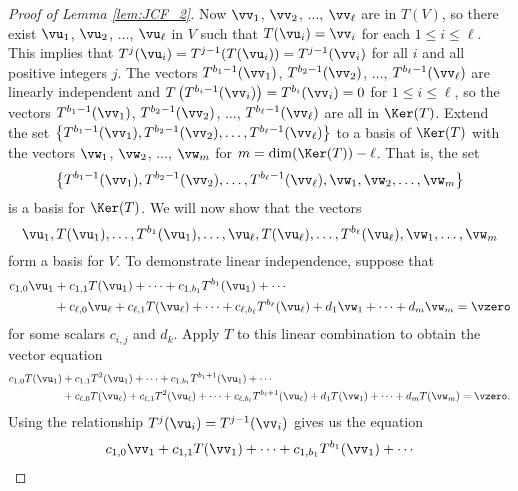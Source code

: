 \begin{proof}[Proof of Lemma \ref{lem:JCF_2}]
Now $\vv_1$, $\vv_2$, $\ldots$, $\vv_{\ell}$ are in $T(V)$, so there exist $\vu_1$, $\vu_2$, $\ldots$, $\vu_{\ell}$ in $V$ such that $T(\vu_i) = \vv_i$ for each $1 \leq i \leq \ell$. This implies that $T^j(\vu_i) = T^{j-1}(T(\vu_i)) = T^{j-1}(\vv_i)$ for all $i$ and all positive integers $j$. The vectors $T^{b_1-1}(\vv_1)$, $T^{b_2-1}(\vv_2)$, $\ldots$, $T^{b_{\ell}-1}(\vv_{\ell})$ are linearly independent and $T\left(T^{b_i-1}(\vv_i)\right) = T^{b_i}(\vv_i) = 0$ for $1 \leq i \leq \ell$, so the vectors $T^{b_1-1}(\vv_1)$, $T^{b_2-1}(\vv_2)$, $\ldots$, $T^{b_{\ell}-1}(\vv_{\ell})$ are all in $\Ker(T)$. Extend the set $\left\{T^{b_1-1}(\vv_1), T^{b_2-1}(\vv_2), \ldots, T^{b_{\ell}-1}(\vv_{\ell})\right\}$ to a basis of $\Ker(T)$ with the vectors $\vw_1$, $\vw_2$, $\ldots$, $\vw_m$ for $m = \dim(\Ker(T)) - \ell$. That is, the set 
\begin{equation} \label{eq:JCF_Ker_basis}
\left\{T^{b_1-1}(\vv_1), T^{b_2-1}(\vv_2), \ldots, T^{b_{\ell}-1}(\vv_{\ell}), \vw_1, \vw_2, \ldots, \vw_m\right\}
\end{equation}
is a basis for $\Ker(T)$. We will now show that the vectors 
\begin{equation} \label{eq:JCF_V_basis} 
\vu_1, T(\vu_1), \ldots, T^{b_1}(\vu_1), \ldots, \vu_{\ell}, T(\vu_{\ell}), \ldots, T^{b_{\ell}}(\vu_{\ell}), \vw_1, \ldots, \vw_m
\end{equation}
form a basis for $V$. To demonstrate linear independence, suppose that 
\begin{align} 
c_{1,0}\vu_1&+c_{1,1}T(\vu_1)+ \cdots + c_{1,b_1}T^{b_1}(\vu_1) +  \cdots \notag \\
&+ c_{\ell,0}\vu_{\ell} +  c_{\ell,1}T(\vu_{\ell})+ \cdots + c_{\ell,b_{\ell}}T^{b_{\ell}}(\vu_{\ell}) +  d_1\vw_1+  \cdots +  d_m\vw_m = \vzero \label{eq:JCF_Lemma_2}
\end{align}
for some scalars $c_{i,j}$ and $d_k$. Apply $T$ to this linear combination to obtain the vector equation 
\begin{align*}
c_{1,0}T(\vu_1)&+c_{1,1}T^2(\vu_1)+ \cdots + c_{1,b_1}T^{b_1+1}(\vu_1) +  \cdots \\
	&+ c_{\ell,0}T(\vu_{\ell}) +  c_{\ell,1}T^2(\vu_{\ell})+ \cdots + c_{\ell,b_{\ell}}T^{b_{\ell}+1}(\vu_{\ell}) +  d_1T(\vw_1)+  \cdots +  d_mT(\vw_m) = \vzero.
\end{align*}
Using the relationship $T^j(\vu_i) = T^{j-1}(\vv_i)$ gives us the equation
\begin{align*}
c_{1,0}\vv_1&+c_{1,1}T(\vv_1)+ \cdots + c_{1,b_1}T^{b_1}(\vv_1) +  \cdots \\

\end{align*}
\end{proof}
